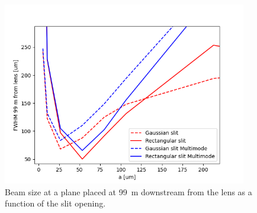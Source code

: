 \documentclass{iucr}              %
\begin{document}
\begin{figure}
    \centering
    \includegraphics[width=0.95\textwidth]{figures/Figure99m.png}
    \caption{Beam size at a plane placed at \SI{99}{\meter} downstream from the lens as a function of the slit opening.}
    \label{fig:slit99m}
\end{figure}











\end{document}
